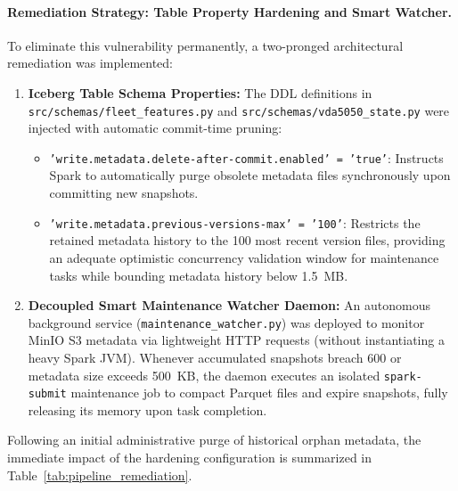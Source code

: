 \paragraph{Remediation Strategy: Table Property Hardening and Smart Watcher.}
To eliminate this vulnerability permanently, a two-pronged architectural remediation was implemented:
\begin{enumerate}
    \item \textbf{Iceberg Table Schema Properties:} The DDL definitions in \texttt{src/schemas/fleet\_features.py} and \texttt{src/schemas/vda5050\_state.py} were injected with automatic commit-time pruning:
    \begin{itemize}
        \item \texttt{'write.metadata.delete-after-commit.enabled' = 'true'}: Instructs Spark to automatically purge obsolete metadata files synchronously upon committing new snapshots.
        \item \texttt{'write.metadata.previous-versions-max' = '100'}: Restricts the retained metadata history to the 100 most recent version files, providing an adequate optimistic concurrency validation window for maintenance tasks while bounding metadata history below 1.5~MB.
    \end{itemize}
    \item \textbf{Decoupled Smart Maintenance Watcher Daemon:} An autonomous background service (\texttt{maintenance\_watcher.py}) was deployed to monitor MinIO S3 metadata via lightweight HTTP requests (without instantiating a heavy Spark JVM). Whenever accumulated snapshots breach 600 or metadata size exceeds 500~KB, the daemon executes an isolated \texttt{spark-submit} maintenance job to compact Parquet files and expire snapshots, fully releasing its memory upon task completion.
\end{enumerate}

Following an initial administrative purge of historical orphan metadata, the immediate impact of the hardening configuration is summarized in Table~\ref{tab:pipeline_remediation}.

